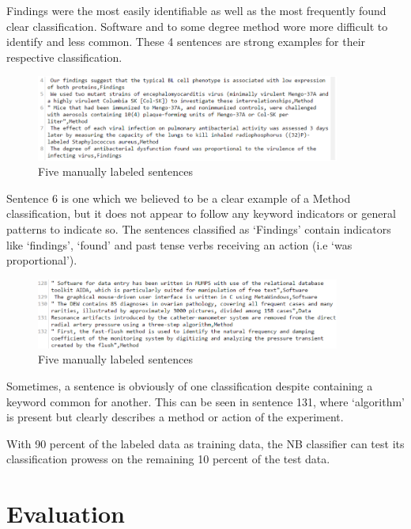 \documentclass{article} %
\begin{document}
\vspace{20mm}
\vspace{20mm}

Findings were the most easily identifiable as well as the most frequently found clear classification. Software and to some degree method wore more difficult to identify and less common. These 4 sentences are strong examples for their respective classification. 

\begin{figure}[h!]
\centering
\includegraphics[width=100mm]{Screenshot_122.png}
\caption{Five manually labeled sentences}
\end{figure}
 
Sentence 6 is one which we believed to be a clear example of a Method classification, but it does not appear to follow any keyword indicators or general patterns to indicate so. The sentences classified as ‘Findings’ contain indicators like ‘findings’, ‘found’ and past tense verbs receiving an action (i.e ‘was proportional’).

\begin{figure}[h!]
\centering
\includegraphics[width=100mm]{Screenshot_121.png}
\caption{Five manually labeled sentences}
\end{figure}

Sometimes, a sentence is obviously of one classification despite containing a keyword common for another. This can be seen in sentence 131, where ‘algorithm’ is present but clearly describes a method or action of the experiment.
 
With 90 percent of the labeled data as training data, the NB classifier can test its classification prowess on the remaining 10 percent of the test data.

\section{Evaluation}
\end{document}
